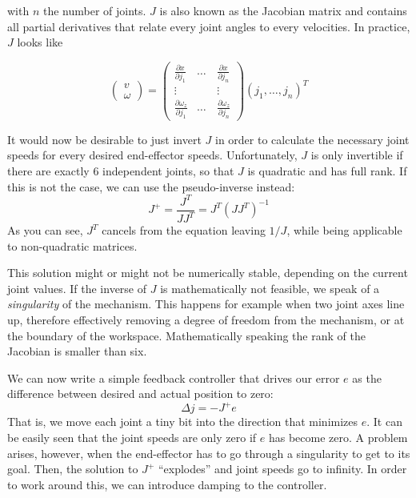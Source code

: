 with $ n$ the number of joints. $J$ is also known as the Jacobian matrix  and contains all partial derivatives that relate every joint angles to every velocities. In practice, $J$ looks like

\begin{equation}
\left(\begin{array}{c}v\\\omega\end{array}\right)=\left(\begin{array}{ccc}\frac{\partial{x}}{\partial{j_1}} & \ldots & \frac{\partial{x}}{\partial{j_n}}\\\vdots & \quad & \vdots\\\frac{\partial{\omega_z}}{\partial{j_1}} & \ldots & \frac{\partial{\omega_z}}{\partial{j_n}}\end{array}\right)(j_1,\ldots,j_n)^T
\end{equation}

It would now be desirable to just invert $J$ in order to calculate the necessary joint speeds for every desired end-effector speeds. Unfortunately, $ J$ is only invertible if there are exactly 6 independent joints, so that $ J$ is quadratic and has full rank. If this is not the case, we can use the pseudo-inverse instead:
\begin{equation}
J^+=\frac{J^T}{JJ^T}=J^T(JJ^T)^{-1}
\end{equation}
As you can see, $J^T$ cancels from the equation leaving $1/J$, while being applicable to non-quadratic matrices.

This solution might or might not be numerically stable, depending on the current joint values. If the inverse of $J$ is mathematically not feasible, we speak of a \emph{singularity} of the mechanism. This happens for example when two joint axes line up, therefore effectively removing a degree of freedom from the mechanism, or at the boundary of the workspace. Mathematically speaking the rank of the Jacobian is smaller than six.

We can now write a simple feedback controller that drives our error $e$ as the difference between desired and actual position to zero:
\begin{equation}
\Delta{j}=-J^+e
\end{equation}
That is, we move each joint a tiny bit into the direction that minimizes $e$.
It can be easily seen that the joint speeds are only zero if $e$ has become zero. A problem arises, however, when the end-effector has to go through a singularity to get to its goal. Then, the solution to $ J^+$ ``explodes'' and joint speeds go to infinity. In order to work around this, we can introduce damping to the controller.

